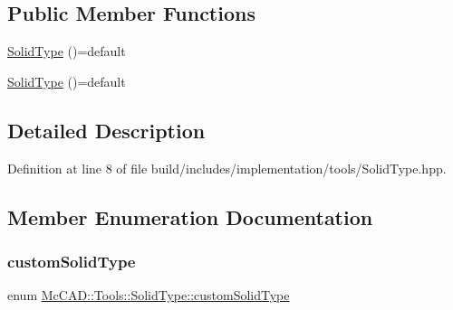 \subsection*{Public Member Functions}
\begin{DoxyCompactItemize}
\item 
\hyperlink{classMcCAD_1_1Tools_1_1SolidType_ac0567cd77239b78645632ac3646f99de}{Solid\+Type} ()=default
\item 
\hyperlink{classMcCAD_1_1Tools_1_1SolidType_ac0567cd77239b78645632ac3646f99de}{Solid\+Type} ()=default
\end{DoxyCompactItemize}


\subsection{Detailed Description}


Definition at line 8 of file build/includes/implementation/tools/\+Solid\+Type.\+hpp.



\subsection{Member Enumeration Documentation}
\mbox{\label{classMcCAD_1_1Tools_1_1SolidType_a69c62abbe9fa709ccbaf47d4daf356e1}} 
\subsubsection{\texorpdfstring{custom\+Solid\+Type}{customSolidType}\hspace{0.1cm}{\footnotesize\ttfamily [1/2]}}
{\footnotesize\ttfamily enum \hyperlink{classMcCAD_1_1Tools_1_1SolidType_a69c62abbe9fa709ccbaf47d4daf356e1}{Mc\+C\+A\+D\+::\+Tools\+::\+Solid\+Type\+::custom\+Solid\+Type}}

